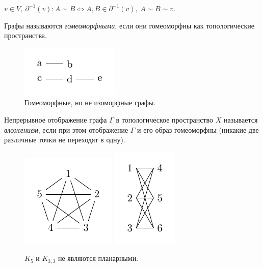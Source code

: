 $v \in V, \ \partial^{-1}(v): A \sim B \Longleftrightarrow A, B \in \partial^{-1}(v), \ A \sim B \sim v$.

\begin{definition}
    Графы называются \textit{гомеоморфными}, если они гомеоморфны как топологические пространства.
\end{definition}

\begin{figure}[h]
    \centering
    \includegraphics[scale=2]{images/c3.3.pdf}
    \caption{Гомеоморфные, но не изоморфные графы.}
    \label{fig:c3.3}
\end{figure}

\begin{definition}
    Непрерывное отображение графа $\Gamma$ в топологическое пространство $X$ называется \textit{вложением}, если при этом отображение $\Gamma$ и его образ гомеоморфны (никакие две различные точки не переходят в одну).
\end{definition}

\begin{figure}[h]
    \centering
    \includegraphics[scale=2]{images/c3.4.1.pdf}
    \includegraphics[scale=2]{images/c3.4.2.pdf}
    \caption{$K_5$ и $K_{3,3}$ не являются планарными.}
    \label{fig:c3.4.1,2}
\end{figure}

